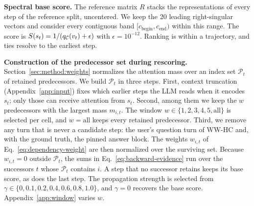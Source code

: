 
\textbf{Spectral base score.}
The reference matrix $R$ stacks the representations of every step of the reference split, uncentered. We keep the 20 leading right-singular vectors and consider every contiguous band $[c_{\mathrm{begin}}, c_{\mathrm{end}})$ within this range.
The score is $S(s_t)=1/(q_{\mathcal{C}}(v_t)+\epsilon)$ with $\epsilon=10^{-12}$. Ranking is within a trajectory, and ties resolve to the earliest step.

\textbf{Construction of the predecessor set during rescoring.}
Section~\ref{sec:method:weights} normalizes the attention mass over an index set $\mathcal{P}_t$ of retained predecessors. We build $\mathcal{P}_t$ in three steps. First, context truncation (Appendix~\ref{app:input}) fixes which earlier steps the LLM reads when it encodes $s_t$; only those can receive attention from $s_t$. Second, among them we keep the $w$ predecessors with the largest mass $m_{i,t}$. The window $w\in\{1,2,3,4,5,\text{all}\}$ is selected per cell, and $w=\text{all}$ keeps every retained predecessor. Third, we remove any turn that is never a candidate step: the user's question turn of \textsc{WW-HC} and, with the ground truth, the pinned answer block. The weights $w_{i,t}$ of Eq.~\ref{eq:dependency-weight} are then normalized over the surviving set. Because $w_{i,t}=0$ outside $\mathcal{P}_t$, the sums in Eq.~\ref{eq:backward-evidence} run over the successors $t$ whose $\mathcal{P}_t$ contains $i$. A step that no successor retains keeps its base score, as does the last step. The propagation strength is selected from $\gamma\in\{0, 0.1, 0.2, 0.4, 0.6, 0.8, 1.0\}$, and $\gamma=0$ recovers the base score. Appendix~\ref{app:window} varies $w$.

